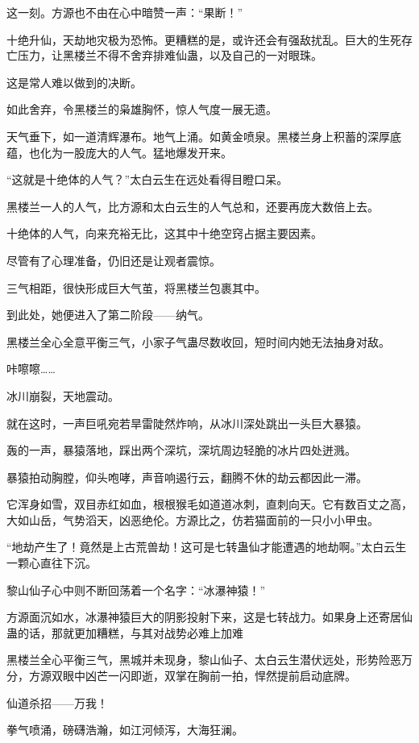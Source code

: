 \begin{this_body}
这一刻。方源也不由在心中暗赞一声：“果断！”

十绝升仙，天劫地灾极为恐怖。更糟糕的是，或许还会有强敌扰乱。巨大的生死存亡压力，让黑楼兰不得不舍弃排难仙蛊，以及自己的一对眼珠。

这是常人难以做到的决断。

如此舍弃，令黑楼兰的枭雄胸怀，惊人气度一展无遗。

天气垂下，如一道清辉瀑布。地气上涌。如黄金喷泉。黑楼兰身上积蓄的深厚底蕴，也化为一股庞大的人气。猛地爆发开来。

“这就是十绝体的人气？”太白云生在远处看得目瞪口呆。

黑楼兰一人的人气，比方源和太白云生的人气总和，还要再庞大数倍上去。

十绝体的人气，向来充裕无比，这其中十绝空窍占据主要因素。

尽管有了心理准备，仍旧还是让观者震惊。

三气相距，很快形成巨大气茧，将黑楼兰包裹其中。

到此处，她便进入了第二阶段——纳气。

黑楼兰全心全意平衡三气，小家子气蛊尽数收回，短时间内她无法抽身对敌。

咔嚓嚓……

冰川崩裂，天地震动。

就在这时，一声巨吼宛若旱雷陡然炸响，从冰川深处跳出一头巨大暴猿。

轰的一声，暴猿落地，踩出两个深坑，深坑周边轻脆的冰片四处迸溅。

暴猿拍动胸膛，仰头咆哮，声音响遏行云，翻腾不休的劫云都因此一滞。

它浑身如雪，双目赤红如血，根根猴毛如道道冰刺，直刺向天。它有数百丈之高，大如山岳，气势滔天，凶恶绝伦。方源比之，仿若猫面前的一只小小甲虫。

“地劫产生了！竟然是上古荒兽劫！这可是七转蛊仙才能遭遇的地劫啊。”太白云生一颗心直往下沉。

黎山仙子心中则不断回荡着一个名字：“冰瀑神猿！”

方源面沉如水，冰瀑神猿巨大的阴影投射下来，这是七转战力。如果身上还寄居仙蛊的话，那就更加糟糕，与其对战势必难上加难

黑楼兰全心平衡三气，黑城并未现身，黎山仙子、太白云生潜伏远处，形势险恶万分，方源双眼中凶芒一闪即逝，双掌在胸前一拍，悍然提前启动底牌。

仙道杀招——万我！

拳气喷涌，磅礴浩瀚，如江河倾泻，大海狂澜。


\end{this_body}
